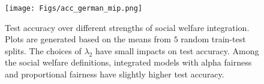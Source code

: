 \documentclass{article}[11pt]
\begin{document}
\begin{figure}[h]
    \centering
    \texttt{[image: Figs/acc\_german\_mip.png]}
    \caption{\small{Test accuracy over different strengths of social welfare integration. Plots are generated based on the means from $5$ random train-test splits. The choices of $\lambda_2$ have small impacts on test accuracy. Among the social welfare definitions, integrated models with alpha fairness and proportional fairness have slightly higher test accuracy.}}
    \label{fig:acc} 
\end{figure}


\begin{comment}
Next, we analyze the post-processing integration. Since fairness does not appear in the training problem, we focus on the loan decisions and utility distributions obtained from the social welfare optimization based decisions. 

We first generate Lorenz curves of the loan distributions $\vd$ and the utility distributions $\vu$ from the considered optimization models. 
Fig. \ref{fig:lorenz} shows that maximizing the two alpha fairness based SWF leads to more equitable loan and utility distributions. This observation is consistent with the respective fairness interpretations of these objectives. To provide more refined insights, 

\begin{figure}[h]
    \centering
    \begin{subfigure}{0.45\textwidth}
    \centering
    \texttt{[image: Figs/lorenz1\_sametr.png]}
    \caption{Decision utilities $\vu$}
    \label{fig:lorenz-u}
    \end{subfigure}
    \begin{subfigure}{0.45\textwidth}
    \centering
    \texttt{[image: Figs/lorenz1\_a.png]}
    \caption{Granted loans $\vd$}
    \label{fig:lorenz-d}
    \end{subfigure}
    \caption{\small{Lorenz curves based on the means from 5 random test datasets.}}
    \label{fig:lorenz}
\end{figure}    
\end{comment}

\end{document}
